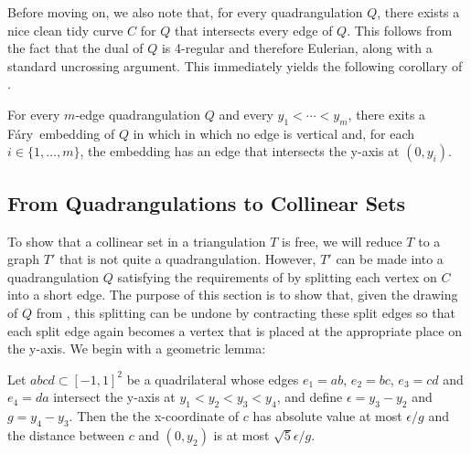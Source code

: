 \documentclass{patmorin}
\newcommand{\Fary}{Fáry}
\begin{document}
Before moving on, we also note that, for every quadrangulation $Q$, there
exists a nice clean tidy curve $C$ for $Q$ that intersects every edge
of $Q$. This follows from the fact that the dual of $Q$ is 4-regular
and therefore Eulerian, along with a standard uncrossing argument.
This immediately yields the following corollary of .

\begin{cor}
  For every $m$-edge quadrangulation $Q$ and every $y_1<\cdots<y_m$,
  there exits a \Fary\ embedding of $Q$ in which in which no edge is
  vertical and, for each $i\in\{1,\ldots,m\}$, the embedding has an edge
  that intersects the y-axis at $(0,y_i)$.
\end{cor}

\subsection{From Quadrangulations to Collinear Sets}

To show that a collinear set in a triangulation $T$ is free, we will
reduce $T$ to a graph $T'$ that is not quite a quadrangulation.  However,
$T'$ can be made into a quadrangulation $Q$ satisfying the requirements
of  by splitting each vertex on $C$ into a short edge. The
purpose of this section is to show that, given the drawing of $Q$ from
, this splitting can be undone by contracting these split
edges so that each split edge again becomes a vertex that is placed at
the appropriate place on the y-axis.  We begin with a geometric lemma:

\begin{lem}
  Let $abcd\subset[-1,1]^2$ be a quadrilateral whose edges
  $e_1=ab$, $e_2=bc$, $e_3=cd$ and $e_4=da$ intersect the y-axis at
  $y_1<y_2<y_3<y_4$, and define $\epsilon=y_3-y_2$ and $g=y_4-y_3$.  Then
  the the x-coordinate of $c$ has absolute value at most $\epsilon/g$ and
  the distance between $c$ and $(0,y_2)$ is at most $\sqrt{5}\epsilon/g$.
\end{lem}
\end{document}
